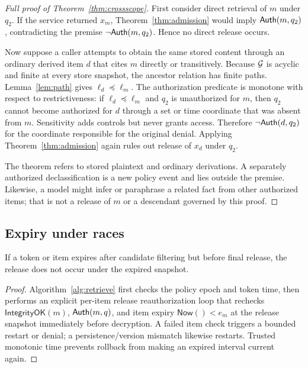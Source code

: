\begin{proof}[Full proof of Theorem~\ref{thm:crossscope}]
First consider direct retrieval of $m$ under $q_2$. If the service returned $x_m$, Theorem~\ref{thm:admission} would imply $\mathsf{Auth}(m,q_2)$, contradicting the premise $\neg\mathsf{Auth}(m,q_2)$. Hence no direct release occurs.

Now suppose a caller attempts to obtain the same stored content through an ordinary derived item $d$ that cites $m$ directly or transitively. Because $\mathcal{G}$ is acyclic and finite at every store snapshot, the ancestor relation has finite paths. Lemma~\ref{lem:path} gives $\ell_d\preceq\ell_m$. The authorization predicate is monotone with respect to restrictiveness: if $\ell_d\preceq\ell_m$ and $q_2$ is unauthorized for $m$, then $q_2$ cannot become authorized for $d$ through a set or time coordinate that was absent from $m$. Sensitivity adds controls but never grants access. Therefore $\neg\mathsf{Auth}(d,q_2)$ for the coordinate responsible for the original denial. Applying Theorem~\ref{thm:admission} again rules out release of $x_d$ under $q_2$.

The theorem refers to stored plaintext and ordinary derivations. A separately authorized declassification is a new policy event and lies outside the premise. Likewise, a model might infer or paraphrase a related fact from other authorized items; that is not a release of $m$ or a descendant governed by this proof.
\end{proof}

\subsection{Expiry under races}

\begin{lemma}
If a token or item expires after candidate filtering but before final release, the release does not occur under the expired snapshot.
\end{lemma}
\begin{proof}
Algorithm~\ref{alg:retrieve} first checks the policy epoch and token time, then performs an explicit per-item release reauthorization loop that rechecks $\mathsf{IntegrityOK}(m)$, $\mathsf{Auth}(m,q)$, and item expiry $\mathsf{Now}()<e_m$ at the release snapshot immediately before decryption. A failed item check triggers a bounded restart or denial; a persistence/version mismatch likewise restarts. Trusted monotonic time prevents rollback from making an expired interval current again.
\end{proof}

